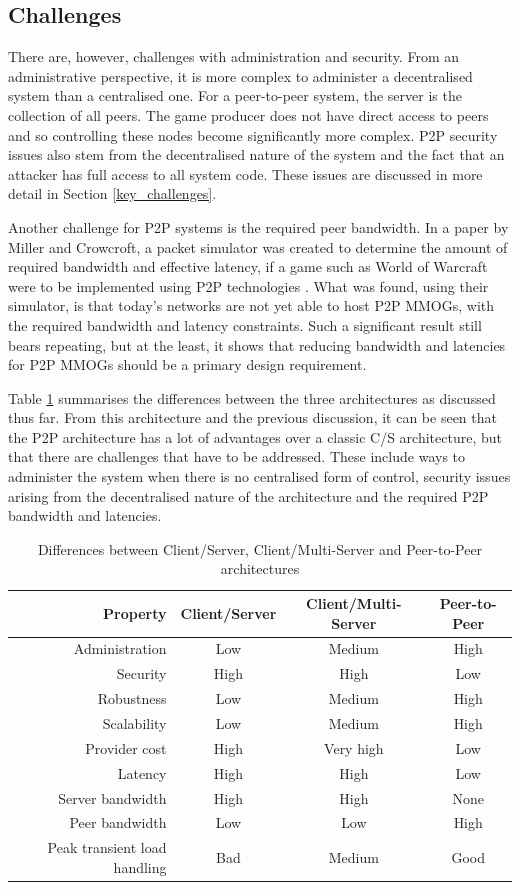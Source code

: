 \documentclass[10pt,a4paper,journal,cspaper,compsoc]{IEEEtran}
\begin{document}
\subsection{Challenges}

There are, however, challenges with administration and security. From an administrative perspective, it is more complex to administer a decentralised
system than a centralised one. For a peer-to-peer system, the server is the collection of all peers. The game producer does not have direct access to
peers and so controlling these nodes become significantly more complex. P2P security issues also stem from the decentralised nature of the system and
the fact that an attacker has full access to all system code. These issues are discussed in more detail in Section \ref{key_challenges}.

Another challenge for P2P systems is the required peer bandwidth. In a paper by Miller and Crowcroft, a packet simulator was created to determine the
amount of required bandwidth and effective latency, if a game such as World of Warcraft were to be implemented using P2P technologies
\cite{Miller_p2p_infeasability}. What was found, using their simulator, is that today's networks are not yet able to host P2P MMOGs, with the
required bandwidth and latency constraints. Such a significant result still bears repeating, but at the least, it shows that reducing bandwidth and
latencies for P2P MMOGs should be a primary design requirement.

Table \ref{tab_archs} summarises the differences between the three architectures as discussed thus far. From this architecture and the previous
discussion, it can be seen that the P2P architecture has a lot of advantages over a classic C/S architecture, but that there are challenges that have
to be addressed. These include ways to administer the system when there is no centralised form of control, security issues arising from the
decentralised nature of the architecture and the required P2P bandwidth and latencies.
%
\begin{table}[htbp]
\centering
\begin{tabular}{|r|c|c|c|}
\hline
Property & Client/Server & Client/Multi-Server & Peer-to-Peer\\
\hline
Administration & Low & Medium & High\\
Security & High & High & Low\\
Robustness & Low & Medium & High\\
Scalability & Low & Medium & High\\
Provider cost & High & Very high & Low\\
Latency & High & High & Low\\
Server bandwidth & High & High & None\\
Peer bandwidth & Low & Low & High\\
Peak transient load handling & Bad & Medium & Good\\
\hline
\end{tabular}
\caption{Differences between Client/Server, Client/Multi-Server and Peer-to-Peer architectures} \label{tab_archs}
\end{table}
\end{document}
